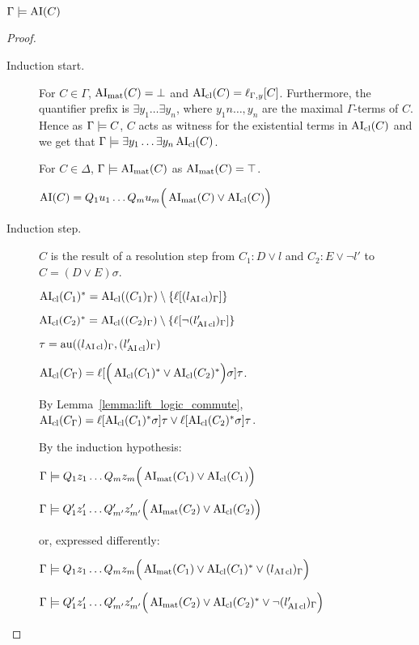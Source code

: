 \documentclass[,%
	paper=a4,%
	DIV12, %
	twoside=false,%
	liststotoc,
	bibtotoc,
	draft=false,%
	numbers=noendperiod
]{scrartcl}
\begin{document}
\begin{conj}
	$\Gamma \models  \operatorname{AI}(C)$
\end{conj}
\begin{proof} ~
	\begin{description}
		\item[Induction start.]
			For $C\in\Gamma$, $\operatorname{AI}_\mathrm{mat}(C) = \bot$ and $\operatorname{AI}_\mathrm{cl}(C) = \ell_{\Gamma,y}[C]$.
			Furthermore, the quantifier prefix is $\exists y_1 \dots \exists y_n $, where $y_1n\dotsc , y_n$ are the maximal $\Gamma$-terms of $C$.
			Hence as $\Gamma \models C$, $C$ acts as witness for the existential terms in $\operatorname{AI}_\mathrm{cl}(C)$ and we get that $\Gamma \models \exists y_1 \dots \exists y_n \operatorname{AI}_\mathrm{cl}(C)$.

			For $C\in \Delta$, $\Gamma \models \operatorname{AI}_\mathrm{mat}(C)$ as $\operatorname{AI}_\mathrm{mat}(C) = \top$.

			$\operatorname{AI}(C) = Q_1 u_1 \ldots Q_m u_m \Big( \operatorname{AI}_\mathrm{mat}(C) \lor \operatorname{AI}_\mathrm{cl}(C) \Big)$

		\item[Induction step.]
			$C$ is the result of a resolution step from $C_1: D\lor l$ and $C_2: E\lor \lnot l'$ to $C = (D \lor E)\sigma$.

			$ \operatorname{AI}_\mathrm{cl}(C_1)^* = \operatorname{AI}_\mathrm{cl}((C_1)_\Gamma) \setminus \{\ell[(l{_{\operatorname{AI}\mathrm{cl}}})_\Gamma]\}$

			$ \operatorname{AI}_\mathrm{cl}(C_2)^* = \operatorname{AI}_\mathrm{cl}((C_2)_\Gamma)\setminus \{\ell[\lnot (l{_{\operatorname{AI}\mathrm{cl}}'})_\Gamma]\}$

			$\tau  = \operatorname{au}((l{_{\operatorname{AI}\mathrm{cl}}})_\Gamma, (l{_{\operatorname{AI}\mathrm{cl}}'})_\Gamma)$


			$\operatorname{AI}_\mathrm{cl}(C_\Gamma) =
			\ell[\Big( \operatorname{AI}_\mathrm{cl}(C_1)^* \lor \operatorname{AI}_\mathrm{cl}(C_2)^* \Big)\sigma] \tau$.


			By Lemma~\ref{lemma:lift_logic_commute},
			$\operatorname{AI}_\mathrm{cl}(C_\Gamma) =
			\ell[\operatorname{AI}_\mathrm{cl}(C_1)^*\sigma]\tau \lor \ell[\operatorname{AI}_\mathrm{cl}(C_2)^*\sigma] \tau$.

			By the induction hypothesis:

			$\Gamma \models Q_1 z_1 \dots Q_m z_m \Big( \operatorname{AI}_\mathrm{mat}(C_1) \lor \operatorname{AI}_\mathrm{cl}(C_1)  \Big)$

			$\Gamma \models Q_1' z_1' \dots Q_{m'}' z_{m'}' \Big( \operatorname{AI}_\mathrm{mat}(C_2) \lor \operatorname{AI}_\mathrm{cl}(C_2) \Big)$

			or, expressed differently:

			$\Gamma \models  Q_1 z_1 \dots Q_m z_m \Big( \operatorname{AI}_\mathrm{mat}(C_1) \lor \operatorname{AI}_\mathrm{cl}(C_1)^* \lor {(l{\ensuremath{_{\operatorname{AI}\mathrm{cl}}}})_\Gamma}\Big)$

			$\Gamma \models Q_1' z_1' \dots Q_{m'}' z_{m'}' \Big( \operatorname{AI}_\mathrm{mat}(C_2) \lor \operatorname{AI}_\mathrm{cl}(C_2)^* \lor {\lnot (l{\ensuremath{_{\operatorname{AI}\mathrm{cl}}}'})_\Gamma} \Big)$



\end{description}
\end{proof}
\end{document}
